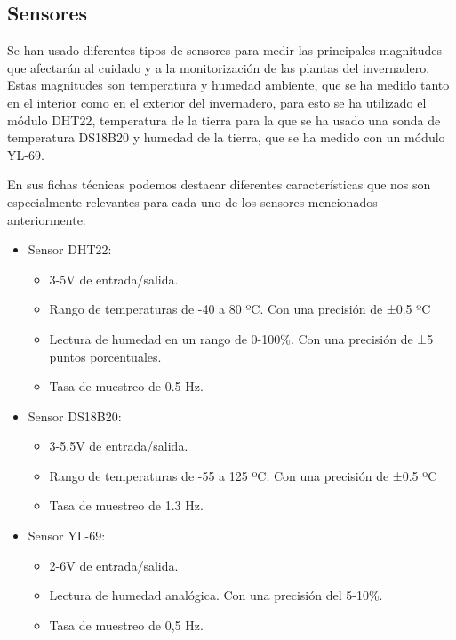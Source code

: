\documentclass[a4paper, 12pt, oneside]{book}
\begin{document}
\subsection{Sensores}
\label{subsec:sensores}

Se han usado diferentes tipos de sensores para medir las principales magnitudes que afectarán al cuidado y a la monitorización de las plantas del invernadero. Estas magnitudes son temperatura y humedad ambiente, que se ha medido tanto en el interior como en el exterior del invernadero, para esto se ha utilizado el módulo DHT22, temperatura de la tierra para la que se ha usado una sonda de temperatura DS18B20 y humedad de la tierra, que se ha medido con un módulo YL-69.

En sus fichas técnicas podemos destacar diferentes características que nos son especialmente relevantes para cada uno de los sensores mencionados anteriormente:

\begin{itemize}
	\item Sensor DHT22:
	\begin{itemize}
		\item 3-5V de entrada/salida.
		\item Rango de temperaturas de -40 a 80 ºC. Con una precisión de ±0.5 ºC
		\item Lectura de humedad en un rango de 0-100\%. Con una precisión de ±5 puntos porcentuales.
		\item Tasa de muestreo de 0.5 Hz.
	\end{itemize}
\end{itemize}

\begin{itemize}
	\item Sensor DS18B20:
	\begin{itemize}
		\item 3-5.5V de entrada/salida.
		\item Rango de temperaturas de -55 a 125 ºC. Con una precisión de ±0.5 ºC
		\item Tasa de muestreo de 1.3 Hz.
	\end{itemize}
\end{itemize}

\begin{itemize}
	\item Sensor YL-69:
	\begin{itemize}
		\item 2-6V de entrada/salida.
		\item Lectura de humedad analógica. Con una precisión del 5-10\%.
		\item Tasa de muestreo de 0,5 Hz.
	\end{itemize}
\end{itemize}
\end{document}
